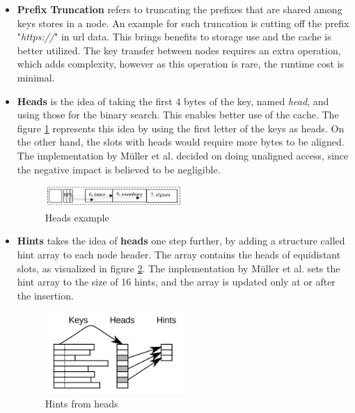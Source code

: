 \begin{itemize}
  \item \textbf{Prefix Truncation} refers to truncating the prefixes that are shared among keys stores in a node. An example for such truncation is cutting off the prefix "\textit{https://}" in url data. This brings benefits to storage use and the cache is better utilized. The key transfer between nodes requires an extra operation, which adds complexity, however as this operation is rare, the runtime cost is minimal. 
  
  \item \textbf{Heads} is the idea of taking the first 4 bytes of the key, named \textit{head}, and using those for the binary search. This enables better use of the cache. The figure \ref{fig:heads} represents this idea by using the first letter of the keys as heads. On the other hand, the slots with heads would require more bytes to be aligned. The implementation by Müller et al. \parencite{mueller2024} decided on doing unaligned access, since the negative impact is believed to be negligible. \\
  
  \begin{figure}[h]
      \centering
      \includegraphics[width=0.5\textwidth]{images/heads.png}
      \caption{Heads example \parencite{modernbtree}}
      \label{fig:heads}
  \end{figure}
    
  \item \textbf{Hints} takes the idea of \textbf{heads} one step further, by adding a structure called hint array to each node header. The array contains the heads of equidistant slots, as visualized in figure \ref{fig:hints}. The implementation by Müller et al. \parencite{mueller2024} sets the hint array to the size of 16 hints, and the array is updated only at or after the insertion. 

  \begin{figure}[h]
      \centering
      \includegraphics[width=0.5\textwidth]{images/hints.png}
      \caption{Hints from heads \parencite{mueller2024}}
      \label{fig:hints}
  \end{figure}
    

\end{itemize}
